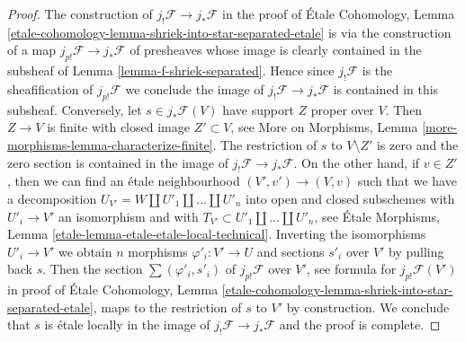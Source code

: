 \documentclass{stacks-project}
\theoremstyle{plain}
\theoremstyle{definition}
\theoremstyle{remark}
\numberwithin{equation}{subsection}
\begin{document}
\begin{proof}
The construction of $j_!\mathcal{F} \to j_*\mathcal{F}$ in the proof of
\'Etale Cohomology, Lemma
\ref{etale-cohomology-lemma-shriek-into-star-separated-etale}
is via the construction of a map
$j_{p!}\mathcal{F} \to j_*\mathcal{F}$ of presheaves
whose image is clearly contained in the subsheaf of
Lemma \ref{lemma-f-shriek-separated}.
Hence since $j_!\mathcal{F}$ is the sheafification of
$j_{p!}\mathcal{F}$ we conclude the image of
$j_!\mathcal{F} \to j_*\mathcal{F}$ is contained in
this subsheaf. Conversely, let $s \in j_*\mathcal{F}(V)$
have support $Z$ proper over $V$. Then $Z \to V$ is
finite with closed image $Z' \subset V$, see
More on Morphisms, Lemma \ref{more-morphisms-lemma-characterize-finite}.
The restriction of $s$ to $V \setminus Z'$ is zero and the zero section is
contained in the image of $j_!\mathcal{F} \to j_*\mathcal{F}$.
On the other hand, if $v \in Z'$, then we can find
an \'etale neighbourhood
$(V', v') \to (V, v)$ such that we have a decomposition
$U_{V'} = W \amalg U'_1 \amalg \ldots \amalg U'_n$
into open and closed subschemes with $U'_i \to V'$ an isomorphism
and with $T_{V'} \subset U'_1 \amalg \ldots \amalg U'_n$, see
\'Etale Morphisms, Lemma \ref{etale-lemma-etale-etale-local-technical}.
Inverting the isomorphisms $U'_i \to V'$
we obtain $n$ morphisms $\varphi'_i : V' \to U$
and sections $s'_i$ over $V'$ by pulling back $s$.
Then the section $\sum (\varphi'_i, s'_i)$ of
$j_{p!}\mathcal{F}$ over $V'$, see formula for $j_{p!}\mathcal{F}(V')$
in proof of \'Etale Cohomology, Lemma
\ref{etale-cohomology-lemma-shriek-into-star-separated-etale},
maps to the restriction of $s$ to $V'$ by construction.
We conclude that $s$ is \'etale locally in the image
of $j_!\mathcal{F} \to j_*\mathcal{F}$ and the proof is complete.
\end{proof}
\end{document}
